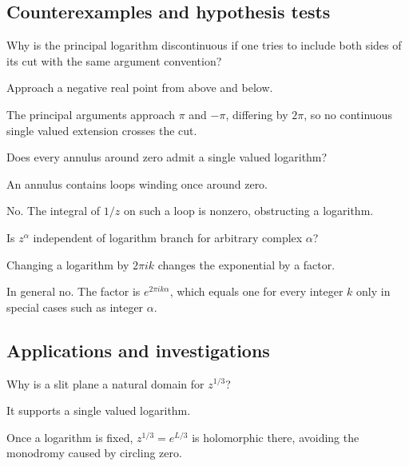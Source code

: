 \subsection*{Counterexamples and hypothesis tests}

\begin{exercise}\label{exr:iv14-expand-10}
Why is the principal logarithm discontinuous if one tries to include both sides of its cut with the same argument convention?
\end{exercise}
\begin{hint}
Approach a negative real point from above and below.
\end{hint}
\begin{solution}
The principal arguments approach \(\pi\) and \(-\pi\), differing by \(2\pi\), so no continuous single valued extension crosses the cut.
\end{solution}

\begin{exercise}\label{exr:iv14-expand-11}
Does every annulus around zero admit a single valued logarithm?
\end{exercise}
\begin{hint}
An annulus contains loops winding once around zero.
\end{hint}
\begin{solution}
No. The integral of \(1/z\) on such a loop is nonzero, obstructing a logarithm.
\end{solution}

\begin{exercise}\label{exr:iv14-expand-12}
Is \(z^\alpha\) independent of logarithm branch for arbitrary complex \(\alpha\)?
\end{exercise}
\begin{hint}
Changing a logarithm by \(2\pi i k\) changes the exponential by a factor.
\end{hint}
\begin{solution}
In general no. The factor is \(e^{2\pi i k\alpha}\), which equals one for every integer \(k\) only in special cases such as integer \(\alpha\).
\end{solution}

\subsection*{Applications and investigations}

\begin{exercise}\label{exr:iv14-expand-13}
Why is a slit plane a natural domain for \(z^{1/3}\)?
\end{exercise}
\begin{hint}
It supports a single valued logarithm.
\end{hint}
\begin{solution}
Once a logarithm is fixed, \(z^{1/3}=e^{L/3}\) is holomorphic there, avoiding the monodromy caused by circling zero.
\end{solution}

